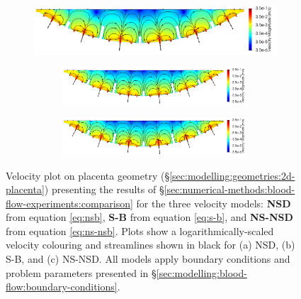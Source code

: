             \begin{figure}
                \centering
                \begin{subfigure}[b]{\textwidth}
                    \centering
                    \includegraphics[width=\textwidth]{diagrams/results-modelling/velocity-transport/meshandsoln_dg_velocity_placenta_nsb_velocity-log.png}
                    \caption{}
                    \label{fig:4-models-placenta:nsb}
                \begin{subfigure}[b]{\textwidth}
                    \centering
                    \includegraphics[width=\textwidth]{diagrams/results-modelling/velocity-transport/meshandsoln_dg_velocity_placenta_s-b_velocity-log.png}
                    \caption{}
                    \label{fig:4-models-placenta:s-b}
                \end{subfigure}
                \hfill
                \begin{subfigure}[b]{\textwidth}
                    \centering
                    \includegraphics[width=\textwidth]{diagrams/results-modelling/velocity-transport/meshandsoln_dg_velocity_placenta_ns-nsb_velocity-log.png}
                    \caption{}
                    \label{fig:4-models-placenta:ns-nsb}
                \end{subfigure}
                \end{subfigure}
                \caption{Velocity plot on placenta geometry (\S\ref{sec:modelling:geometries:2d-placenta}) presenting the results of \S\ref{sec:numerical-methods:blood-flow-experiments:comparison} for the three velocity models: \textbf{NSD} from equation \eqref{eq:nsb}, \textbf{S-B} from equation \eqref{eq:s-b}, and \textbf{NS-NSD} from equation \eqref{eq:ns-nsb}. Plots show a logarithmically-scaled velocity colouring and streamlines shown in black for (a) NSD, (b) S-B, and (c) NS-NSD. All models apply boundary conditions and problem parameters presented in \S\ref{sec:modelling:blood-flow:boundary-conditions}.}
                \label{fig:4-models-placenta}
            \end{figure}
    
